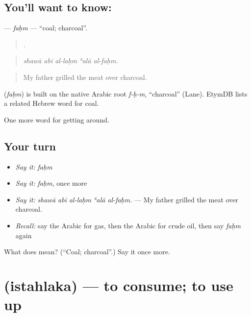 \subsection*{You'll want to know: }
\textbf{} — \emph{faḥm} — \textquotedblleft{}coal; charcoal\textquotedblright{}.

\begin{quote}
    .
\end{quote}

\begin{quote}
\emph{shawā abī al-laḥm ʿalā al-faḥm.}
\end{quote}

\begin{quote}
My father grilled the meat over charcoal.
\end{quote}

\begin{cousinweb}
\textbf{} (\emph{faḥm}) is built on the native Arabic root \emph{f-ḥ-m}, \textquotedblleft{}charcoal\textquotedblright{} (Lane). EtymDB lists a related Hebrew word for coal.
\end{cousinweb}

\begin{grammarlens}[title={What you've built}]
One more word for getting around.
\end{grammarlens}

\subsection*{Your turn}
\begin{itemize}
\raggedright
  \item \emph{Say it:} \emph{faḥm}
  \item \emph{Say it:} \emph{faḥm}, once more
  \item \emph{Say it:} \emph{shawā abī al-laḥm ʿalā al-faḥm.} — My father grilled the meat over charcoal.
  \item \emph{Recall:} say the Arabic for gas, then the Arabic for crude oil, then say \emph{faḥm} again
\end{itemize}

\begin{tcolorbox}[breakable,colback=teal!4,colframe=teal!35!black,title={Before you move on}]
What does  mean? (\textquotedblleft{}Coal; charcoal\textquotedblright{}.) Say it once more.
\end{tcolorbox}
\section[\texorpdfstring{\ar{استهلك} (istahlaka)}{استهلك (istahlaka)}]{ (istahlaka) — to consume; to use up}

